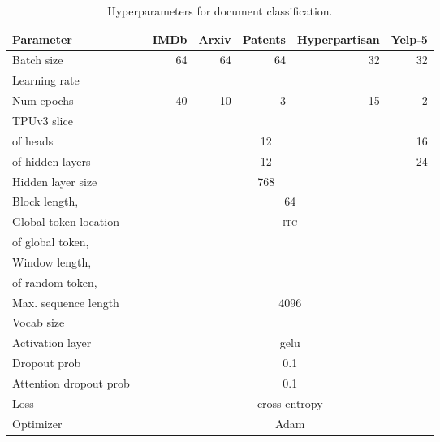 \documentclass{article}
\begin{document}
\begin{table}[bht]
\small
\centering
\begin{tabular}{@{}l c r r r r r @{}}
\toprule
Parameter & & IMDb & Arxiv & Patents & Hyperpartisan & Yelp-5  \\
\midrule
 Batch size & & 64 & 64 & 64 & 32 & 32 \\
 Learning rate & &  &  &  &  & \\
 Num epochs & & 40 & 10 & 3 & 15 & 2 \\
 TPUv3 slice  & &  &  &  &  &  \\
  of heads & & \multicolumn{4}{c}{12} & 16\\
  of hidden layers & & \multicolumn{4}{c}{12} & 24 \\
 Hidden layer size & & \multicolumn{4}{c}{768} &  \\
 Block length,  & & \multicolumn{5}{c}{64} \\
 Global token location & & \multicolumn{5}{c}{\textsc{itc}} \\
  of global token,  & & \multicolumn{5}{c}{} \\
 Window length,   & & \multicolumn{5}{c}{ } \\
  of random token,  & & \multicolumn{5}{c}{} \\
 Max. sequence length & & \multicolumn{5}{c}{4096}\\
 Vocab size & & \multicolumn{5}{c}{}\\
 Activation layer & & \multicolumn{5}{c}{gelu} \\ 
 Dropout prob & & \multicolumn{5}{c}{0.1} \\
 Attention dropout prob & & \multicolumn{5}{c}{0.1} \\
 Loss & & \multicolumn{5}{c}{cross-entropy} \\
 Optimizer & & \multicolumn{5}{c}{Adam}\\
\bottomrule
\end{tabular}
\vspace{2mm}
\caption{Hyperparameters for document classification.}
\label{tab:app_dc}
\end{table}
\end{document}
